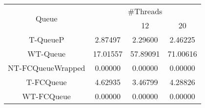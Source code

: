 \begin{tabular}{|c|c|c|c|}
\hline
\multirow{2}{*}{Queue} & \multicolumn{3}{c|}{\#Threads}\\\cline{2-4}& \quad 4 & 12 & 20\\
\hline
\hline
T-QueueP & 2.87497 & 2.29600 & 2.46225\\
WT-Queue & 17.01557 & 57.89091 & 71.00616\\
NT-FCQueueWrapped & 0.00000 & 0.00000 & 0.00000\\
T-FCQueue & 4.62935 & 3.46799 & 4.28826\\
WT-FCQueue & 0.00000 & 0.00000 & 0.00000\\
\hline\end{tabular}
